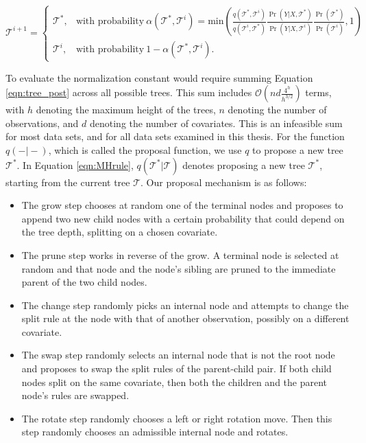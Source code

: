 \begin{equation}\label{eqn:MHrule}
\mathcal{T}^{i+1} =\begin{cases}
\mathcal{T}^*, & \text{with probability}\ \alpha(\mathcal{T}^*, \mathcal{T}^i) = \text{min}\left(\frac{q(\mathcal{T}^*, \mathcal{T}^i)}{q(\mathcal{T}^i, \mathcal{T}^*)}\frac{\Pr(Y\vert X, \mathcal{T}^*)}{\Pr(Y\vert X,\mathcal{T}^i)}\frac{\Pr(\mathcal{T}^{*})}{\Pr(\mathcal{T}^i)},1 \right) \\
\mathcal{T}^{i}, & \text{with probability}\ 1-\alpha(\mathcal{T}^*, \mathcal{T}^i).
\end{cases} \end{equation}

To evaluate the normalization constant would require summing Equation \ref{eqn:tree_post} across all possible trees. This sum includes $\mathcal{O}(nd\frac{4^h}{h^{3/2}})$ terms, with $h$ denoting the maximum height of the trees, $n$ denoting the number of observations, and $d$ denoting the number of covariates. This is an infeasible sum for most data sets, and for all data sets examined in this thesis. For the function $q(-\vert-)$, which is called the proposal function, we use $q$ to propose a new tree $\mathcal{T}^*$.   
In Equation \ref{eqn:MHrule}, $q(\mathcal{T}^*\vert\mathcal{T})$ denotes proposing a new tree $\mathcal{T}^*$, starting from the current tree $\mathcal{T}$. 
 Our proposal mechanism is as follows:
  \begin{itemize}
 \item The grow step chooses at random one of the terminal nodes and proposes to append two new child nodes with a certain probability that could depend on the tree depth, splitting on a chosen covariate.
 \item The prune step works in reverse of the grow. A terminal node is selected at random and that node and the node's sibling are pruned to the immediate parent of the two child nodes.
 \item The change step randomly picks an internal node and attempts to change the split rule at the node with that of another observation, possibly on a different covariate.
  \item The swap step randomly selects an internal node that is not the root node and proposes to swap the split rules of the parent-child pair. If both child nodes split on the same covariate, then both the children and the parent node's rules are swapped.
  \item The rotate step randomly chooses a left or right rotation move. Then this step randomly chooses an admissible internal node and rotates.
 \end{itemize}
